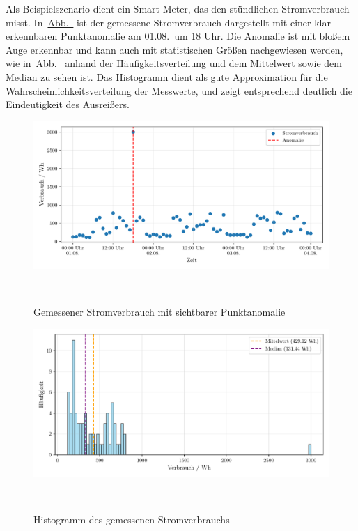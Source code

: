 Als Beispielszenario dient ein Smart Meter, das den stündlichen Stromverbrauch misst.
In~\hyperref[fig:punktanomalie_bsp]{Abb.~} ist der gemessene Stromverbrauch dargestellt mit einer klar
erkennbaren Punktanomalie am 01.08.~um 18 Uhr. Die Anomalie ist mit bloßem Auge erkennbar und kann auch mit statistischen Größen
nachgewiesen werden, wie in~\hyperref[fig:punktanomalie_hist]{Abb.~} anhand der Häufigkeitsverteilung
und dem Mittelwert sowie dem Median zu sehen ist. Das Histogramm dient als gute Approximation für die Wahrscheinlichkeitsverteilung
der Messwerte, und zeigt entsprechend deutlich die Eindeutigkeit des Ausreißers.

\begin{figure}[h]
    \centering
    \includegraphics[width=\linewidth]{ch5_anomalien/abbildungen/punktanomalie_bsp.pdf}
    \caption{Gemessener Stromverbrauch mit sichtbarer Punktanomalie}
~\label{fig:punktanomalie_bsp}
\end{figure}

\begin{figure}[h]
    \centering
    \includegraphics[width=\linewidth]{ch5_anomalien/abbildungen/punktanomalie_hist.pdf}
    \caption{\centering Histogramm des gemessenen Stromverbrauchs}
~\label{fig:punktanomalie_hist}
\end{figure}
